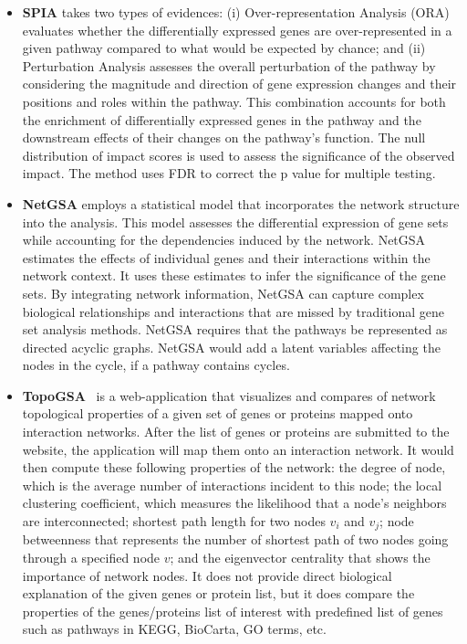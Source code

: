 \begin{itemize}
\item \textbf{SPIA} \cite{tarca2009novel} takes two types of evidences: (i) Over-representation Analysis (ORA) evaluates whether the differentially expressed genes are over-represented in a given pathway compared to what would be expected by chance; and (ii) Perturbation Analysis assesses the overall perturbation of the pathway by considering the magnitude and direction of gene expression changes and their positions and roles within the pathway. This combination accounts for both the enrichment of differentially expressed genes in the pathway and the downstream effects of their changes on the pathway’s function. The null distribution of impact scores is used to assess the significance of the observed impact. The method uses FDR to correct the p value for multiple testing.

\item \textbf{NetGSA} \cite{Shojaie:2009} employs a statistical model that incorporates the network structure into the analysis. This model assesses the differential expression of gene sets while accounting for the dependencies induced by the network. NetGSA estimates the effects of individual genes and their interactions within the network context. It uses these estimates to infer the significance of the gene sets. By integrating network information, NetGSA can capture complex biological relationships and interactions that are missed by traditional gene set analysis methods. 
NetGSA requires that the pathways be represented as directed acyclic graphs. NetGSA would add a  latent variables affecting the nodes in the cycle, if a pathway contains cycles.

\item \textbf{TopoGSA}~\cite{Glaab:2010a} is a web-application that visualizes and compares of network topological properties of a given set of genes or proteins mapped onto interaction networks. After the list of genes or proteins are submitted to the website, the application will map them onto an interaction network. It would then compute these following properties of the network: the degree of node, which is the average number of interactions incident to this node; the local clustering coefficient, which measures the likelihood that a node's neighbors are interconnected; shortest path length for two nodes $v_i$ and $v_j$; node betweenness that represents the number of shortest path of two nodes going through a specified node $v$; and the eigenvector centrality that shows the importance of network nodes. It does not provide direct biological explanation of the given genes or protein list, but it does compare the properties of the genes/proteins list of interest with predefined list of genes such as pathways in KEGG, BioCarta, GO terms, etc.


\end{itemize}
